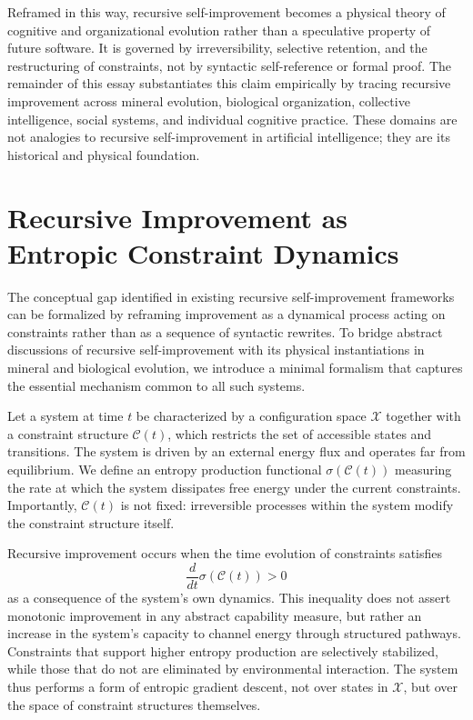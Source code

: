 \documentclass[11pt]{article}
\begin{document}
Reframed in this way, recursive self-improvement becomes a physical theory of cognitive and organizational evolution rather than a speculative property of future software. It is governed by irreversibility, selective retention, and the restructuring of constraints, not by syntactic self-reference or formal proof. The remainder of this essay substantiates this claim empirically by tracing recursive improvement across mineral evolution, biological organization, collective intelligence, social systems, and individual cognitive practice. These domains are not analogies to recursive self-improvement in artificial intelligence; they are its historical and physical foundation.

\section{Recursive Improvement as Entropic Constraint Dynamics}

The conceptual gap identified in existing recursive self-improvement frameworks can be formalized by reframing improvement as a dynamical process acting on constraints rather than as a sequence of syntactic rewrites. To bridge abstract discussions of recursive self-improvement with its physical instantiations in mineral and biological evolution, we introduce a minimal formalism that captures the essential mechanism common to all such systems.

Let a system at time $t$ be characterized by a configuration space $\mathcal{X}$ together with a constraint structure $\mathcal{C}(t)$, which restricts the set of accessible states and transitions. The system is driven by an external energy flux and operates far from equilibrium. We define an entropy production functional $\sigma(\mathcal{C}(t))$ measuring the rate at which the system dissipates free energy under the current constraints. Importantly, $\mathcal{C}(t)$ is not fixed: irreversible processes within the system modify the constraint structure itself.

Recursive improvement occurs when the time evolution of constraints satisfies
\begin{equation}
\frac{d}{dt}\sigma(\mathcal{C}(t)) > 0
\end{equation}
as a consequence of the system’s own dynamics. This inequality does not assert monotonic improvement in any abstract capability measure, but rather an increase in the system’s capacity to channel energy through structured pathways. Constraints that support higher entropy production are selectively stabilized, while those that do not are eliminated by environmental interaction. The system thus performs a form of entropic gradient descent, not over states in $\mathcal{X}$, but over the space of constraint structures themselves.
\end{document}
